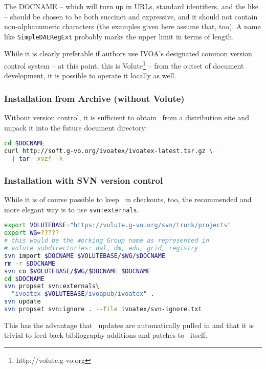 \documentclass[11pt,a4paper]{ivoa}
\begin{document}
The DOCNAME -- which will turn up in URLs, standard identifiers, and the
like -- should be chosen to be both succinct and expressive, and it
should not contain non-alphanumeric characters (the examples given here
assume that, too).  A name
like \texttt{SimpleDALRegExt} probably marks the upper limit in terms of
length.

While it is clearly preferable if authors use IVOA's 
designated common version control
system -- at this point, this is
Volute\footnote{http://volute.g-vo.org} -- from the outset of
document development, it is possible to operate it locally as well.

\subsubsection{Installation from Archive (without Volute)}

Without version control, it is sufficient to obtain \ivoatex\ from a
distribution site and unpack it into the future document directory:

\begin{lstlisting}[language=sh]
cd $DOCNAME
curl http://soft.g-vo.org/ivoatex/ivoatex-latest.tar.gz \
  | tar -xvzf -k
\end{lstlisting}

\subsubsection{Installation with SVN version control}

While it is of course possible to keep \ivoatex\ in checkouts, too,
the recommended and more elegant way is to use \texttt{svn:externals}.

\begin{lstlisting}[language=sh,basicstyle=\footnotesize]
export VOLUTEBASE="https://volute.g-vo.org/svn/trunk/projects"
export WG=?????
# this would be the Working Group name as represented in
# volute subdirectories: dal, dm, edu, grid, registry
svn import $DOCNAME $VOLUTEBASE/$WG/$DOCNAME
rm -r $DOCNAME
svn co $VOLUTEBASE/$WG/$DOCNAME $DOCNAME
cd $DOCNAME
svn propset svn:externals\
  "ivoatex $VOLUTEBASE/ivoapub/ivoatex" .
svn update
svn propset svn:ignore . --file ivoatex/svn-ignore.txt
\end{lstlisting}

This has the advantage that \ivoatex~updates are automatically pulled in
and that it is
trivial to feed back bibliography additions and patches to \ivoatex\
itself.
\end{document}
